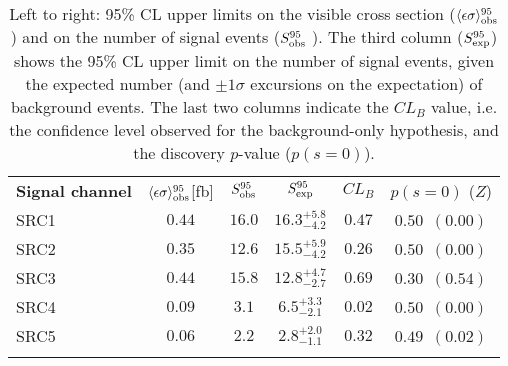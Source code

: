 
\begin{table}
\centering
\setlength{\tabcolsep}{0.0pc}
\begin{tabular*}{\textwidth}{@{\extracolsep{\fill}}lccccc}
\noalign{\smallskip}\hline\noalign{\smallskip}
{\bf Signal channel}                        & $\langle\epsilon{\rm \sigma}\rangle_{\rm obs}^{95}$[fb]  &  $S_{\rm obs}^{95}$  & $S_{\rm exp}^{95}$ & $CL_{B}$ & $p(s=0)$ ($Z$)  \\
\noalign{\smallskip}\hline\noalign{\smallskip}
SRC1    & $0.44$ &  $16.0$ & $ { 16.3 }^{ +5.8 }_{ -4.2 }$ & $0.47$ &
 $ 0.50$~$(0.00)$ \\%
SRC2    & $0.35$ &  $12.6$ & $ { 15.5 }^{ +5.9 }_{ -4.2 }$ & $0.26$ &
$ 0.50$~$(0.00)$ \\%
SRC3    & $0.44$ &  $15.8$ & $ { 12.8 }^{ +4.7 }_{ -2.7 }$ & $0.69$ &
$ 0.30$~$(0.54)$ \\%
SRC4    & $0.09$ &  $3.1$ & $ { 6.5 }^{ +3.3 }_{ -2.1 }$ & $0.02$ & $
0.50$~$(0.00)$ \\%
SRC5    & $0.06$ &  $2.2$ & $ { 2.8 }^{ +2.0 }_{ -1.1 }$ & $0.32$ & $
0.49$~$(0.02)$ \\%
\noalign{\smallskip}\hline\noalign{\smallskip}
\end{tabular*}
\caption[Breakdown of upper limits.]{
Left to right: 95\% CL upper limits on the visible cross section
($\langle\epsilon\sigma\rangle_{\rm obs}^{95}$) and on the number of
signal events ($S_{\rm obs}^{95}$ ).  The third column
($S_{\rm exp}^{95}$) shows the 95\% CL upper limit on the number of
signal events, given the expected number (and $\pm 1\sigma$
excursions on the expectation) of background events.
The last two columns
indicate the $CL_B$ value, i.e. the confidence level observed for
the background-only hypothesis, and the discovery $p$-value ($p(s = 0)$). 
\label{table.results.exclxsec.pval.upperlimit}}
\end{table}
%
